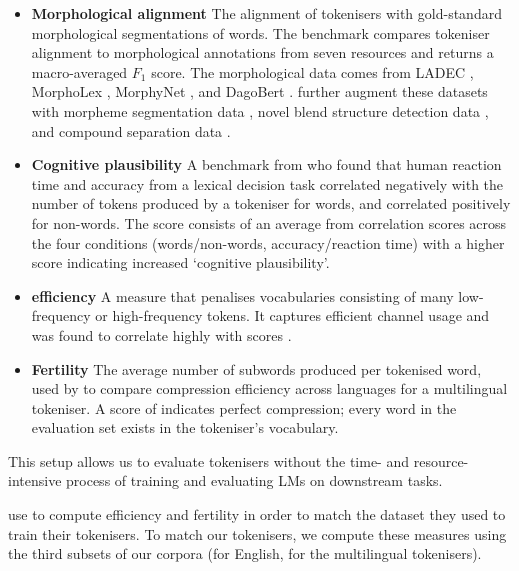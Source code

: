 \begin{itemize}[leftmargin=*]
    \item \textbf{Morphological alignment} The alignment of tokenisers with gold-standard morphological segmentations of words. The benchmark compares tokeniser alignment to morphological annotations from seven resources and returns a macro-averaged $F_1$ score. The morphological data comes from LADEC \citep{gagne2019ladec}, MorphoLex \citep{sanchez2018morpholex}, MorphyNet \citep{batsuren-etal-2021-morphynet}, and DagoBert \citep{hofmann-etal-2020-dagobert}. \citet{uzan-etal-2024-greed} further augment these datasets with morpheme segmentation data \citep{batsuren-etal-2022-unimorph}, novel blend structure detection data \citep{pinter-etal-2021-will}, and compound separation data \citep{minixhofer-etal-2023-compoundpiece}.
    \item \textbf{Cognitive plausibility} A benchmark from \citet{beinborn-pinter-2023-analyzing} who found that human reaction time and accuracy from a lexical decision task correlated negatively with the number of tokens produced by a tokeniser for words, and correlated positively for non-words. The score consists of an average from correlation scores across the four conditions (words/non-words, accuracy/reaction time) with a higher score indicating increased `cognitive plausibility'.
    \item \textbf{\renyi efficiency} A measure that penalises vocabularies consisting of many low-frequency or high-frequency tokens. It captures efficient channel usage and was found to correlate highly with  scores \citep{zouhar-etal-2023-tokenization}.
    \item \textbf{Fertility} The average number of subwords produced per tokenised word, used by \citet{acs2019exploring} to compare compression efficiency across languages for a multilingual tokeniser. A score of  indicates perfect compression; every word in the evaluation set exists in the tokeniser's vocabulary.
\end{itemize}

This setup allows us to evaluate tokenisers without the time- and resource-intensive process of training and evaluating LMs on downstream tasks. 

\citet{uzan-etal-2024-greed} use \minipile \citep{kaddour2023minipile} to compute \renyi efficiency and fertility in order to match the dataset they used to train their tokenisers. To match our tokenisers, we compute these measures using the third subsets of our corpora (\fineweb for English, \commoncorpus for the multilingual tokenisers).

